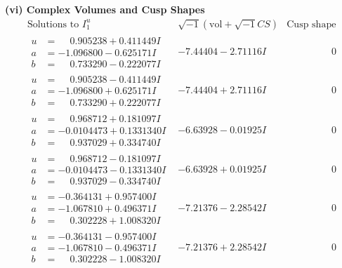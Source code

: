 \documentclass[1p]{elsarticle_modified}
\theoremstyle{definition}
\newcommand{\I}{\sqrt{-1}}
\begin{document}
\newpage\flushleft \textbf{(vi) Complex Volumes and Cusp Shapes}
$$\begin{array}{c|c|c}  
\text{Solutions to }I^u_{1}& \I (\text{vol} + \sqrt{-1}CS) & \text{Cusp shape}\\
 \hline 
\begin{aligned}
u &= \phantom{-}0.905238 + 0.411449 I \\
a &= -1.096800 - 0.625171 I \\
b &= \phantom{-}0.733290 - 0.222077 I\end{aligned}
 & -7.44404 - 2.71116 I & \phantom{-0.000000 } 0 \\ \hline\begin{aligned}
u &= \phantom{-}0.905238 - 0.411449 I \\
a &= -1.096800 + 0.625171 I \\
b &= \phantom{-}0.733290 + 0.222077 I\end{aligned}
 & -7.44404 + 2.71116 I & \phantom{-0.000000 } 0 \\ \hline\begin{aligned}
u &= \phantom{-}0.968712 + 0.181097 I \\
a &= -0.0104473 + 0.1331340 I \\
b &= \phantom{-}0.937029 + 0.334740 I\end{aligned}
 & -6.63928 - 0.01925 I & \phantom{-0.000000 } 0 \\ \hline\begin{aligned}
u &= \phantom{-}0.968712 - 0.181097 I \\
a &= -0.0104473 - 0.1331340 I \\
b &= \phantom{-}0.937029 - 0.334740 I\end{aligned}
 & -6.63928 + 0.01925 I & \phantom{-0.000000 } 0 \\ \hline\begin{aligned}
u &= -0.364131 + 0.957400 I \\
a &= -1.067810 + 0.496371 I \\
b &= \phantom{-}0.302228 + 1.008320 I\end{aligned}
 & -7.21376 - 2.28542 I & \phantom{-0.000000 } 0 \\ \hline\begin{aligned}
u &= -0.364131 - 0.957400 I \\
a &= -1.067810 - 0.496371 I \\
b &= \phantom{-}0.302228 - 1.008320 I\end{aligned}
 & -7.21376 + 2.28542 I & \phantom{-0.000000 } 0 \\ \hline\begin{aligned}

\end{aligned}
\end{array}$$
\end{document}
